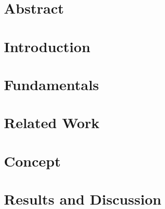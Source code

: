 \documentclass[oneside,11pt,a4paper,twoside]{scrreprt}
\begin{document}
\chapter*{Abstract}
\thispagestyle{empty}

\cleardoublepage
\setcounter{page}{1}
\pagestyle{headings}
\renewcommand{\baselinestretch}{1.3}
\small\normalsize
\tableofcontents
\renewcommand{\baselinestretch}{1}
\small\normalsize
\cleardoublepage
\setcounter{page}{1}
\chapter{Introduction}\label{sec:introduction}
  
  \cleardoublepage
\chapter{Fundamentals}\label{sec:fundamentals}
  
  \cleardoublepage
\chapter{Related Work}\label{sec:relatedwork}
  
  \cleardoublepage
\chapter{Concept}\label{sec:concept}
  
  \cleardoublepage
\chapter{Results and Discussion}\label{sec:resultsanddiscussion}
  
  \cleardoublepage
\end{document}
